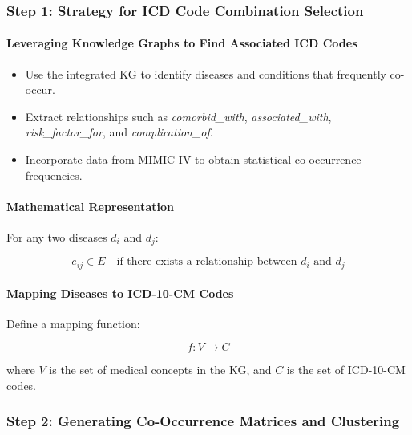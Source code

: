 \documentclass[12pt, a4paper]{article}
\begin{document}
\subsubsection{Step 1: Strategy for ICD Code Combination Selection}

\paragraph{Leveraging Knowledge Graphs to Find Associated ICD Codes}

\begin{itemize}
    \item Use the integrated KG to identify diseases and conditions that frequently co-occur.
    \item Extract relationships such as \textit{comorbid\_with}, \textit{associated\_with}, \textit{risk\_factor\_for}, and \textit{complication\_of}.
    \item Incorporate data from MIMIC-IV to obtain statistical co-occurrence frequencies.
\end{itemize}

\paragraph{Mathematical Representation}

For any two diseases \( d_i \) and \( d_j \):

\begin{equation}
e_{ij} \in E \quad \text{if there exists a relationship between } d_i \text{ and } d_j
\end{equation}

\paragraph{Mapping Diseases to ICD-10-CM Codes}

Define a mapping function:

\begin{equation}
f: V \rightarrow C
\end{equation}

where \( V \) is the set of medical concepts in the KG, and \( C \) is the set of ICD-10-CM codes.

\subsubsection{Step 2: Generating Co-Occurrence Matrices and Clustering}
\end{document}
